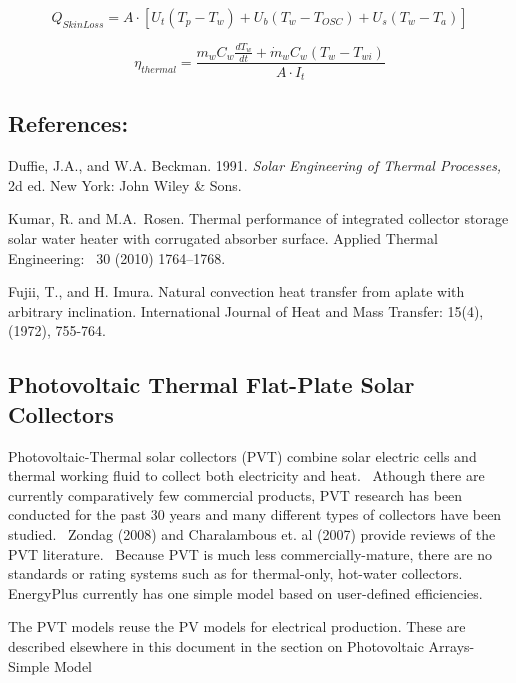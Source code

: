 \begin{equation}
{Q_{SkinLoss}} = A \cdot \left[ {{U_t}\left( {{T_p} - {T_w}} \right) + {U_b}\left( {{T_w} - {T_{OSC}}} \right) + {U_s}\left( {{T_w} - {T_a}} \right)} \right]
\end{equation}

\begin{equation}
{\eta_{thermal}} = \frac{{{m_w}{C_w}\frac{{d{T_w}}}{{dt}} + {{\dot m}_w}{C_w}\left( {{T_w} - {T_{wi}}} \right)}}{{A \cdot {I_t}}}
\end{equation}

\subsection{References:}\label{references-1-016}

Duffie, J.A., and W.A. Beckman. 1991. \emph{Solar Engineering of Thermal Processes,} 2d ed. New York: John Wiley \& Sons.

Kumar, R. and M.A.~Rosen. Thermal performance of integrated collector storage solar water heater with corrugated absorber surface. Applied Thermal Engineering:~ 30 (2010) 1764--1768.

Fujii, T., and H. Imura. Natural convection heat transfer from aplate with arbitrary inclination. International Journal of Heat and Mass Transfer: 15(4), (1972), 755-764.

\subsection{Photovoltaic Thermal Flat-Plate Solar Collectors}\label{photovoltaic-thermal-flat-plate-solar-collectors}

Photovoltaic-Thermal solar collectors (PVT) combine solar electric cells and thermal working fluid to collect both electricity and heat.~ Athough there are currently comparatively few commercial products, PVT research has been conducted for the past 30 years and many different types of collectors have been studied.~ Zondag (2008) and Charalambous et. al (2007) provide reviews of the PVT literature.~ Because PVT is much less commercially-mature, there are no standards or rating systems such as for thermal-only, hot-water collectors.~ EnergyPlus currently has one simple model based on user-defined efficiencies.

The PVT models reuse the PV models for electrical production. These are described elsewhere in this document in the section on Photovoltaic Arrays-Simple Model

